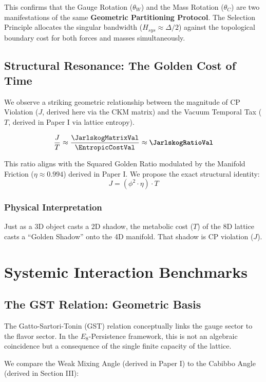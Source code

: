 This confirms that the Gauge Rotation ($\theta_W$) and the Mass Rotation ($\theta_C$) are two manifestations of the same \textbf{Geometric Partitioning Protocol}. The Selection Principle allocates the singular bandwidth ($H_{sys} \approx \Delta/2$) against the topological boundary cost for both forces and masses simultaneously.

\subsection{Structural Resonance: The Golden Cost of Time}
We observe a striking geometric relationship between the magnitude of CP Violation ($J$, derived here via the CKM matrix) and the Vacuum Temporal Tax ($T$, derived in Paper I via lattice entropy).

\begin{equation}
\frac{J}{T} \approx \frac{\JarlskogMatrixVal}{\EntropicCostVal} \approx \textbf{\JarlskogRatioVal}
\end{equation}

This ratio aligns with the Squared Golden Ratio modulated by the Manifold Friction ($\eta \approx 0.994$) derived in Paper I. We propose the exact structural identity:
\begin{equation}
    J = (\phi^2 \cdot \eta) \cdot T
\end{equation}

\subsubsection{Physical Interpretation}
Just as a 3D object casts a 2D shadow, the metabolic cost ($T$) of the 8D lattice casts a ``Golden Shadow'' onto the 4D manifold. That shadow is CP violation ($J$).


\section{Systemic Interaction Benchmarks}

\subsection{The GST Relation: Geometric Basis}
The Gatto-Sartori-Tonin (GST) relation conceptually links the gauge sector to the flavor sector. In the $E_8$-Persistence framework, this is not an algebraic coincidence but a consequence of the single finite capacity of the lattice.

We compare the Weak Mixing Angle (derived in Paper I) to the Cabibbo Angle (derived in Section III):


